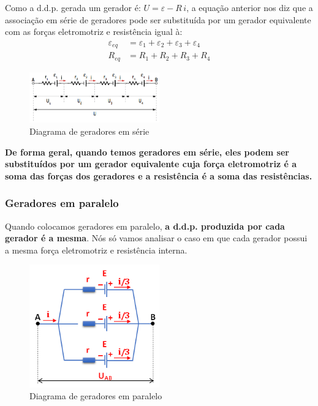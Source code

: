 \documentclass[12pt]{extarticle}
\newcommand{\<}{\langle}
\renewcommand{\>}{\rangle}
\theoremstyle{definition}
\begin{document}
Como a d.d.p. gerada um gerador é: $U = \varepsilon - R\,i$, a equação anterior nos diz que a associação em série de geradores pode ser substituída por um gerador equivalente com as forças eletromotriz e resistência igual à:
\begin{equation}
    \boxed{\begin{split}
        \varepsilon_{eq} &= \varepsilon_1 + \varepsilon_2 + \varepsilon_3 + \varepsilon_4\\
        R_{eq} &= R_1+R_2+R_3+R_4
    \end{split}}
\end{equation}
\begin{figure}[H]
    \centering
    \includegraphics[width=0.5\textwidth]{20200505-associacao-geradores2.png}
    \caption{Diagrama de geradores em série}
    \label{fig:associacao_em_serie}
\end{figure}

\textbf{De forma geral, quando temos geradores em série, eles podem ser substituídos por um gerador equivalente cuja força eletromotriz é a soma das forças dos geradores e a resistência é a soma das resistências.}

\subsubsection{Geradores em paralelo}

Quando colocamos geradores em paralelo, \textbf{a d.d.p. produzida por cada gerador é a mesma}. Nós só vamos analisar o caso em que cada gerador possui a mesma força eletromotriz e resistência interna.

\begin{figure}[H]
    \centering
    \includegraphics[width=0.5\textwidth]{gerador_paralelo.png}
    \caption{Diagrama de geradores em paralelo}
    \label{fig:associacao_em_paralelo}
\end{figure}
\end{document}
